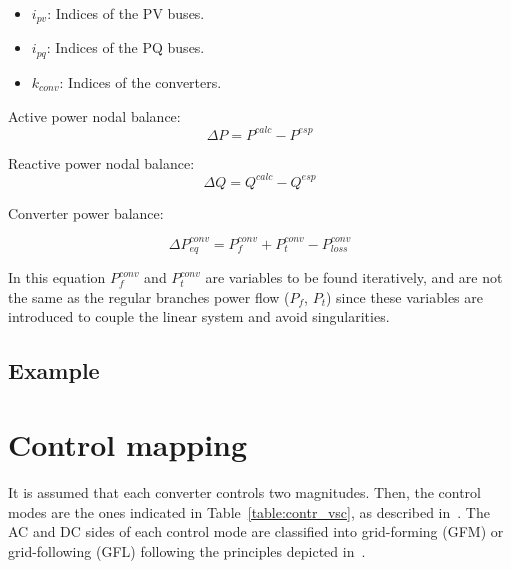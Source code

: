 \documentclass[11pt]{article}
\begin{document}
\begin{itemize}
	
	\item $i_{pv}$: Indices of the PV buses.
	\item $i_{pq}$: Indices of the PQ buses.
	\item $k_{conv}$: Indices of the converters.
\end{itemize}
	
	
	Active power nodal balance:
	\begin{equation}
		\Delta P = P^{calc} - P^{esp}
	\end{equation}
	
	
	Reactive power nodal balance:
	\begin{equation}
		\Delta Q = Q^{calc} - Q^{esp}
	\end{equation}
	
		
	Converter power balance:
	
	\begin{equation}
		\Delta P_{eq}^{conv} = P_f^{conv} + P_t^{conv} - P_{loss}^{conv}
	\end{equation}
	
	In this equation $P_f^{conv}$ and $P_t^{conv}$ are variables to be found iteratively, and are not the same as the regular branches power flow ($P_f$, $P_t$) since these variables are introduced to couple the linear system and avoid singularities.
	
	\subsection{Example}
	

	

	\newpage

	\section{Control mapping}
	It is assumed that each converter controls two magnitudes. Then, the control modes are the ones indicated in Table~\ref{table:contr_vsc}, as described in~\cite{alvarez2021universal}. The AC and DC sides of each control mode are classified into grid-forming (GFM) or grid-following (GFL) following the principles depicted in~\cite{gomis2020principles}.
\end{document}
